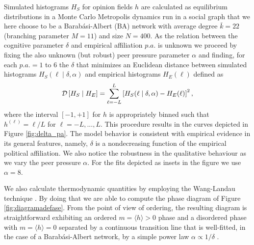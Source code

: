 \documentclass[twocolumn,showpacs]{revtex4-1}
\begin{document}
Simulated histograms $H_S$ for opinion fields $h$ are calculated as equilibrium distributions in a  Monte Carlo Metropolis dynamics run in a social graph that we here choose to be a Barab\'asi-Albert (BA) network \cite{barabasireview} with average degree $\bar{k}=22$ (branching parameter $M=11$) and size $N=400$. As the relation between the cognitive parameter $\delta$ and empirical affiliation $p.a.$ is unknown  we proceed by fixing the also unknown (but robust) peer pressure parameter $\alpha$ and finding, for each $p.a.=1$ to $6$ the $\delta$ that minimizes an Euclidean distance between simulated histograms $H_S(\ell \mid \delta,\alpha)$ and empirical histograms $H_E(\ell)$ defined  as
\begin{equation}
{\cal D}\left[H_S \mid H_E\right]= \sum_{\ell=-L}^{L}\left[H_S(\ell\mid \delta,\alpha)- H_{E}(\ell)
\right]^2,
\label{eq:dist}
\end{equation}
where the interval $[-1,+1]$ for $h$ is appropriately binned such that $h^{(\ell)}=\ell/L$ for $\ell=-L,...,L$. This procedure results in the curves depicted in Figure \ref{fig:delta_pa}. The model behavior is consistent with empirical evidence \cite{Amodio} in its general features, namely, $\delta$ is a nondecreasing function of the empirical political affiliation. We also notice the robustness in the qualitative behaviour as we vary the peer pressure $\alpha$. For the fits depicted as insets in the figure we use $\alpha=8$.   



We also  calculate thermodynamic quantities by employing the Wang-Landau technique \cite{Cavi10,Wang01}. By doing that we are able to compute the phase diagram of Figure \ref{fig:diagramadefase}. From the point of view of ordering, the resulting diagram is straightforward exhibiting an ordered $m=\langle h \rangle >0$ phase and a disordered phase with  $m=\langle h\rangle =0$ separated by a continuous transition line that is well-fitted, in the case of a Barab\'asi-Albert network, by a simple power law $\alpha\propto 1/\delta$ \cite{Cavi10}.  
 
\end{document}
